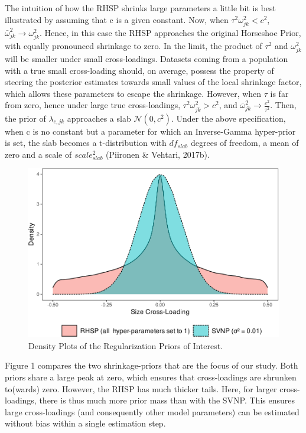 \documentclass[
  man, donotrepeattitle,floatsintext]{apa6}
\begin{document}
The intuition of how the RHSP shrinks large parameters a little bit is best illustrated by assuming that c is a given constant. Now, when \(\tau^2 \omega^2_{jk} < c^2\), \(\bar{\omega}^2_{jk} \to \omega^2_{jk}\). Hence, in this case the RHSP approaches the original Horseshoe Prior, with equally pronounced shrinkage to zero. In the limit, the product of \(\tau^2\) and \(\omega^2_{jk}\) will be smaller under small cross-loadings. Datasets coming from a population with a true small cross-loading should, on average, possess the property of steering the posterior estimates towards small values of the local shrinkage factor, which allows these parameters to escape the shrinkage. However, when \(\tau\) is far from zero, hence under large true cross-loadings, \(\tau^2 \omega^2_{jk} > c^2\), and \(\bar{\omega}^2_{jk} \to \frac{c^2}{\tau^2}\). Then, the prior of \(\lambda_{c,jk}\) approaches a slab \(\mathcal{N}(0, c^2)\). Under the above specification, when c is no constant but a parameter for which an Inverse-Gamma hyper-prior is set, the slab becomes a t-distribution with \(df_{slab}\) degrees of freedom, a mean of zero and a scale of \(scale_{slab}^2\) (Piironen \& Vehtari, 2017b).

\begin{figure}
\centering
\includegraphics{JMBKoch_thesis_files/figure-latex/unnamed-chunk-1-1.pdf}
\caption{\label{fig:unnamed-chunk-1}Density Plots of the Regularization Priors of Interest.}
\end{figure}

Figure 1 compares the two shrinkage-priors that are the focus of our study. Both priors share a large peak at zero, which ensures that cross-loadings are shrunken to(wards) zero. However, the RHSP has much thicker tails. Here, for larger cross-loadings, there is thus much more prior mass than with the SVNP. This ensures large cross-loadings (and consequently other model parameters) can be estimated without bias within a single estimation step.
\end{document}
